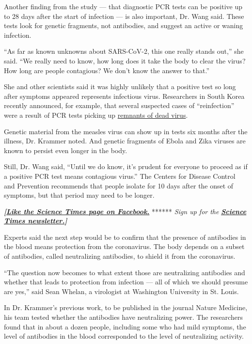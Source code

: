 Another finding from the study --- that diagnostic PCR tests can be
positive up to 28 days after the start of infection --- is also
important, Dr. Wang said. These tests look for genetic fragments, not
antibodies, and suggest an active or waning infection.

``As far as known unknowns about SARS-CoV-2, this one really stands
out,'' she said. ``We really need to know, how long does it take the
body to clear the virus? How long are people contagious? We don't know
the answer to that.''

She and other scientists said it was highly unlikely that a positive
test so long after symptoms appeared represents infectious virus.
Researchers in South Korea recently announced, for example, that several
suspected cases of ``reinfection'' were a result of PCR tests picking up
\href{https://www.newsweek.com/south-korea-experts-say-recovered-coronavirus-patients-retested-positive-because-dead-virus-parts-1500998}{remnants
of dead virus}.

Genetic material from the measles virus can show up in tests six months
after the illness, Dr. Krammer noted. And genetic fragments of Ebola and
Zika viruses are known to persist even longer in the body.

Still, Dr. Wang said, ``Until we do know, it's prudent for everyone to
proceed as if a positive PCR test means contagious virus.'' The Centers
for Disease Control and Prevention recommends that people isolate for 10
days after the onset of symptoms, but that period may need to be longer.

\textbf{\emph{{[}}\href{http://on.fb.me/1paTQ1h}{\emph{Like the Science
Times page on Facebook.}}} ****** \emph{\textbar{} Sign up for the}
\textbf{\href{http://nyti.ms/1MbHaRU}{\emph{Science Times
newsletter.}}\emph{{]}}}

Experts said the next step would be to confirm that the presence of
antibodies in the blood means protection from the coronavirus. The body
depends on a subset of antibodies, called neutralizing antibodies, to
shield it from the coronavirus.

``The question now becomes to what extent those are neutralizing
antibodies and whether that leads to protection from infection --- all
of which we should presume are yes,'' said Sean Whelan, a virologist at
Washington University in St. Louis.

In Dr. Krammer's previous work, to be published in the journal Nature
Medicine, his team tested whether the antibodies have neutralizing
power. The researchers found that in about a dozen people, including
some who had mild symptoms, the level of antibodies in the blood
corresponded to the level of neutralizing activity.

